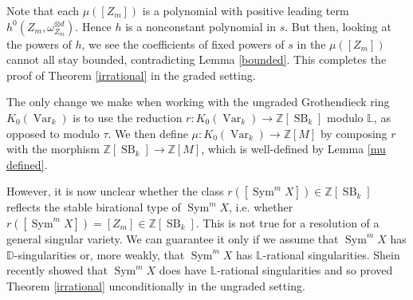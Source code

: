 \documentclass{amsart}
\theoremstyle{definition}
\DeclareMathOperator{\Sym}{Sym}
\DeclareMathOperator{\Var}{Var}
\DeclareMathOperator{\SB}{SB}
\numberwithin{equation}{section}
\begin{document}
Note that each $\mu ([Z_m])$ is a polynomial with positive leading term $h^0(Z_m, \omega_{Z_m}^{\otimes d})$. Hence $h$ is a nonconstant polynomial in $s$. But then, looking at the powers of $h$, we see the coefficients of fixed powers of $s$ in the $\mu ([Z_m] )$ cannot all stay bounded, contradicting Lemma \ref{bounded}. This completes the proof of Theorem \ref{irrational} in the graded setting.

The only change we make when working with the ungraded Grothendieck ring $K_0(\Var_k)$ is to use the reduction $r: K_0(\Var_k) \rightarrow \mathbb{Z}[\SB_k]$ modulo $\mathbb{L}$, as opposed to modulo $\tau$. We then define $\mu: K_0(\Var_k) \rightarrow \mathbb{Z}[M]$ by composing $r$ with the morphism $\mathbb{Z}[\SB_k] \rightarrow \mathbb{Z}[M]$, which is well-defined by Lemma \ref{mu defined}. 

However, it is now unclear whether the class $r([\Sym^m X]) \in \mathbb{Z}[\SB_k]$ reflects the stable birational type of $\Sym^m X$, i.e. whether $r([\Sym^m X]) = [Z_m] \in \mathbb{Z}[\SB_k]$. This is not true for a resolution of a general singular variety. We can guarantee it only if we assume that $\Sym^m X$ has $\mathbb{D}$-singularities or, more weakly, that $\Sym^m X$ has $\mathbb{L}$-rational singularities. Shein \cite{shein} recently showed that $\Sym^m X$ does have $\mathbb{L}$-rational singularities and so proved Theorem \ref{irrational} unconditionally in the ungraded setting.
\end{document}
